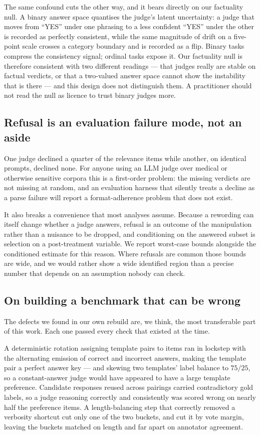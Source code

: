 \documentclass[11pt]{article}          %
\begin{document}
The same confound cuts the other way, and it bears directly on our factuality
null. A binary answer space quantises the judge's latent uncertainty: a judge
that moves from ``YES'' under one phrasing to a less confident ``YES'' under the
other is recorded as perfectly consistent, while the same magnitude of drift on a
five-point scale crosses a category boundary and is recorded as a flip. Binary
tasks compress the consistency signal; ordinal tasks expose it. Our factuality
null is therefore consistent with two different readings --- that judges really
are stable on factual verdicts, or that a two-valued answer space cannot show the
instability that is there --- and this design does not distinguish them. A
practitioner should not read the null as licence to trust binary judges more.

\subsection{Refusal is an evaluation failure mode, not an aside}

One judge declined a quarter of the relevance items while another, on identical
prompts, declined none. For anyone using an LLM judge over medical or otherwise
sensitive corpora this is a first-order problem: the missing verdicts are not
missing at random, and an evaluation harness that silently treats a decline as a
parse failure will report a format-adherence problem that does not exist.

It also breaks a convenience that most analyses assume. Because a rewording can
itself change whether a judge answers, refusal is an outcome of the manipulation
rather than a nuisance to be dropped, and conditioning on the answered subset is
selection on a post-treatment variable. We report worst-case bounds alongside the
conditioned estimate for this reason. Where refusals are common those bounds are
wide, and we would rather show a wide identified region than a precise number
that depends on an assumption nobody can check.

\subsection{On building a benchmark that can be wrong}

The defects we found in our own rebuild are, we think, the most transferable part
of this work. Each one passed every check that existed at the time.

A deterministic rotation assigning template pairs to items ran in lockstep with
the alternating emission of correct and incorrect answers, making the template
pair a perfect answer key --- and skewing two templates' label balance to
$75/25$, so a constant-answer judge would have appeared to have a large
template preference. Candidate responses reused across pairings carried
contradictory gold labels, so a judge reasoning correctly and consistently was
scored wrong on nearly half the preference items. A length-balancing step that
correctly removed a verbosity shortcut cut only one of the two buckets, and cut
it by vote margin, leaving the buckets matched on length and far apart on
annotator agreement.
\end{document}
